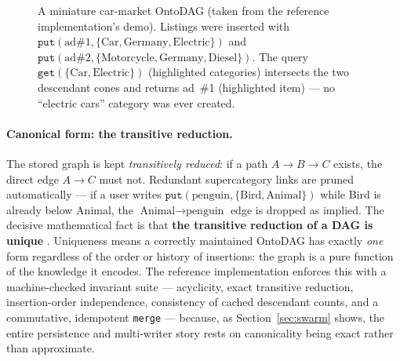\documentclass[10pt,twocolumn]{article}
\begin{document}
\begin{figure}[t]
\centering
{}
\caption{A miniature car-market OntoDAG (taken from the reference
implementation's demo). Listings were inserted with
$\texttt{put}(\text{ad\#1}, \{\text{Car},\text{Germany},\text{Electric}\})$
and $\texttt{put}(\text{ad\#2},
\{\text{Motorcycle},\text{Germany},\text{Diesel}\})$. The query
$\texttt{get}(\{\text{Car},\text{Electric}\})$ (highlighted categories)
intersects the two descendant cones and returns ad~\#1 (highlighted item)
--- no ``electric cars'' category was ever created.}
\label{fig:putget}
\end{figure}

\paragraph{Canonical form: the transitive reduction.}
The stored graph is kept \emph{transitively reduced}: if a path
$A \to B \to C$ exists, the direct edge $A \to C$ must not. Redundant
supercategory links are pruned automatically --- if a user writes
$\texttt{put}(\text{penguin}, \{\text{Bird}, \text{Animal}\})$ while
$\text{Bird}$ is already below $\text{Animal}$, the
$\text{Animal}\to\text{penguin}$ edge is dropped as implied. The decisive
mathematical fact is that \textbf{the transitive reduction of a DAG is
unique} \cite{aho1972}. Uniqueness means a correctly maintained OntoDAG has
exactly \emph{one} form regardless of the order or history of insertions:
the graph is a pure function of the knowledge it encodes. The reference
implementation enforces this with a machine-checked invariant suite ---
acyclicity, exact transitive reduction, insertion-order independence,
consistency of cached descendant counts, and a commutative, idempotent
\texttt{merge} --- because, as Section~\ref{sec:swarm} shows, the entire
persistence and multi-writer story rests on canonicality being exact
rather than approximate.
\end{document}
